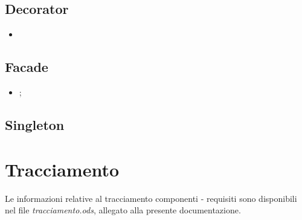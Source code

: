 \documentclass[10pt,a4paper,headinclude,footinclude,hidelinks]{scrreprt} %
\begin{document}
	\section{Decorator}
	\label{sec:stage:design:pattern:decorator}
	\begin{itemize}
	\item {}
	\end{itemize}

	\section{Facade}
	\label{sec:stage:design:pattern:facade}
	\begin{itemize}
	\item {};
	\end{itemize}

	\section{Singleton}
	\label{sec:stage:design:pattern:singleton}

	\chapter{Tracciamento}
	\label{ch:stage:design:tracciamento}
	Le informazioni relative al tracciamento componenti - requisiti sono disponibili nel file \textit{tracciamento.ods}, allegato alla presente documentazione.
\end{document}
